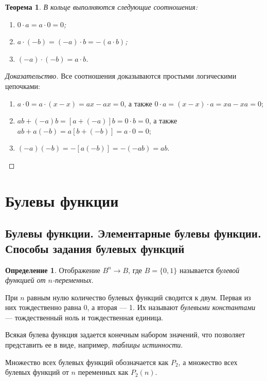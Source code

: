 \documentclass{article}
\newtheorem*{theorem*}{Теорема}
\theoremstyle{plain}
\theoremstyle{definition}
\newtheorem{definition}{Определение}[subsection]
\begin{document}
\begin{theorem*}
	В кольце выполняются следующие соотношения:

	\begin{enumerate}
		\item \(0 \cdot a = a \cdot 0 = 0\);
		\item \(a \cdot (-b) = (-a) \cdot b = -(a \cdot b)\);
		\item \((-a) \cdot (-b) = a \cdot b\).
	\end{enumerate}
\end{theorem*}

\begin{proof}[Доказательство]
	Все соотношения доказываются простыми логическими цепочками:

	\begin{enumerate}
		\item \(a \cdot 0 = a \cdot (x - x) = ax - ax = 0\), а также \(0 \cdot a = (x - x) \cdot a = xa - xa = 0\); 
		\item \(ab + (-a)b = [a + (-a)]b = 0 \cdot b = 0\), а также \(ab + a(-b) = a[b + (-b)] = a \cdot 0 = 0\);
		\item \((-a)(-b) = -[a(-b)] = -(-ab) = ab\).
	\end{enumerate}
\end{proof}

\section{Булевы функции}

\subsection{Булевы функции. Элементарные булевы функции. Способы задания булевых функций}

\begin{definition}
	Отображение \(B^n \rightarrow B\), где \(B = \{0, 1\}\) называется \textit{булевой функцией от \(n\)-переменных}.
\end{definition}

При \(n\) равным нулю количество булевых функций сводится к двум. Первая из них тождественно равна 0, а вторая — 1. Их называют \textit{булевыми константами} — тождественный ноль и тождественная единица.

Всякая булева функция задается конечным набором значений, что позволяет представить ее в виде, например, \textit{таблицы истинности}.

Множество всех булевых функций обозначается как \(P_2\), а множество всех булевых функций от \(n\) переменных как \(P_2(n)\).
\end{document}
